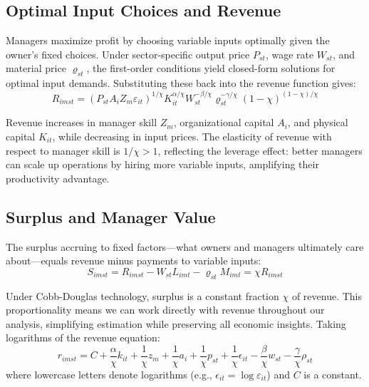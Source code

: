 \documentclass[11pt,a4paper]{article}
\begin{document}
\subsection{Optimal Input Choices and Revenue}

Managers maximize profit by choosing variable inputs optimally given the owner's fixed choices. Under sector-specific output price $P_{st}$, wage rate $W_{st}$, and material price $\varrho_{st}$, the first-order conditions yield closed-form solutions for optimal input demands. Substituting these back into the revenue function gives:
\begin{equation}\label{eq:revenue}
R_{imst} = (P_{st}A_i Z_m \varepsilon_{it})^{1/\chi}
K_{it}^{\alpha/\chi}
W_{st}^{-\beta/\chi}
\varrho_{st}^{-\gamma/\chi}
(1-\chi)^{(1-\chi)/\chi}
\end{equation}

Revenue increases in manager skill $Z_m$, organizational capital $A_i$, and physical capital $K_{it}$, while decreasing in input prices. The elasticity of revenue with respect to manager skill is $1/\chi > 1$, reflecting the leverage effect: better managers can scale up operations by hiring more variable inputs, amplifying their productivity advantage.

\subsection{Surplus and Manager Value}

The surplus accruing to fixed factors—what owners and managers ultimately care about—equals revenue minus payments to variable inputs:
\begin{equation}\label{eq:surplus}
S_{imst} = R_{imst} - W_{st}L_{imt} - \varrho_{st}M_{imt} = \chi R_{imst}
\end{equation}

Under Cobb-Douglas technology, surplus is a constant fraction $\chi$ of revenue. This proportionality means we can work directly with revenue throughout our analysis, simplifying estimation while preserving all economic insights. Taking logarithms of the revenue equation:
\begin{equation}\label{eq:log_revenue}
r_{imst} = C+\frac{\alpha}{\chi} k_{it} + \frac{1}{\chi} z_{m} + \frac{1}{\chi} a_i + \frac{1}{\chi} p_{st} + \frac{1}{\chi}\epsilon_{it} 
- \frac{\beta}{\chi} w_{st} - \frac{\gamma}{\chi} \rho_{st}
\end{equation}
where lowercase letters denote logarithms (e.g., $\epsilon_{it} = \log \varepsilon_{it}$) and $C$ is a constant.
\end{document}
